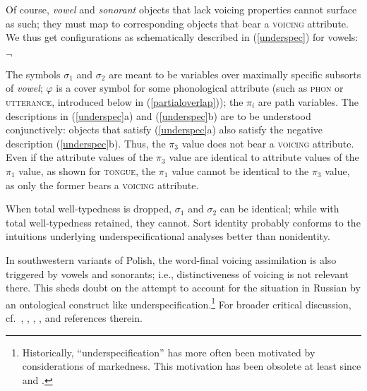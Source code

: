 \documentclass[output=paper]{langsci/langscibook}
\begin{document}
Of course, \textit{vowel}\/ and \textit{sonorant}\/ objects that lack voicing
properties cannot surface as such; they must map to corresponding objects
that bear a \textsc{voicing} attribute. We thus get configurations as
schematically described in (\ref{underspec}) for vowels:
\begin{exe}
\ex
\label{underspec}
\begin{xlist}
\ex
{}
\ex
{\small $\neg$  }
\end{xlist}
\end{exe}
The symbols $\sigma_1$ and $\sigma_2$ are meant to be variables over
maximally specific subsorts of \textit{vowel}\/; $\varphi$ is a cover symbol
for some phonological attribute (such as \textsc{phon} or \textsc{utterance},
introduced below in (\ref{partialoverlap})); the $\pi_i$ are path
variables. The descriptions in (\ref{underspec}a) and (\ref{underspec}b)
are to be understood conjunctively: objects that satisfy (\ref{underspec}a)
also satisfy the negative description (\ref{underspec}b). Thus, the $\pi_3$
value does not bear a \textsc{voicing} attribute. Even if the attribute values
of the $\pi_3$ value are identical to attribute values of the $\pi_1$
value, as shown for \textsc{tongue}, the $\pi_1$ value cannot be identical to
the $\pi_3$ value, as only the former bears a \textsc{voicing} attribute.

When total well-typedness is dropped, $\sigma_1$ and $\sigma_2$ can be
identical; while with total well-typedness retained, they cannot. Sort
identity probably conforms to the intuitions underlying
underspecificational analyses better than nonidentity.

In southwestern variants of Polish, the word-final
voicing assimilation is also triggered by vowels and sonorants; i.e.,
distinctiveness of voicing is not relevant there. This sheds doubt on the
attempt to account for the situation in Russian by an
ontological construct like underspecification.\footnote{%
	Historically,
  ``underspecification'' has more often been motivated by considerations of
  markedness. This motivation has been obsolete at least since
  \cite{kean:81} and
  \cite{Hoehle82c}.%
}
For broader critical discussion, cf.\ \cite[Chapter~9]{broe:93},
\cite{goldsmith:95b},
\cite[{}\S{}6]{cala:95},
\cite[370]{zoll:97}, and references therein.
\end{document}
